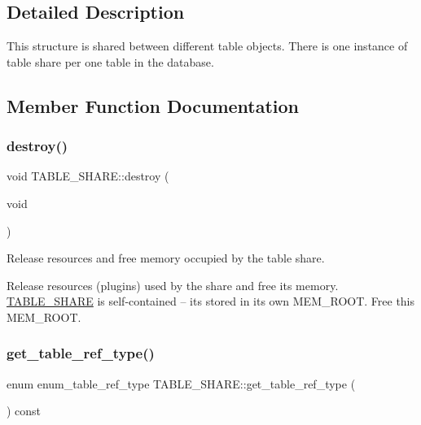 \subsection{Detailed Description}
This structure is shared between different table objects. There is one instance of table share per one table in the database. 

\subsection{Member Function Documentation}
\mbox{\label{structTABLE__SHARE_a18fb7405f4f0af28970bdcbf85aed419}} 
\subsubsection{\texorpdfstring{destroy()}{destroy()}}
{\footnotesize\ttfamily void T\+A\+B\+L\+E\+\_\+\+S\+H\+A\+R\+E\+::destroy (\begin{DoxyParamCaption}\item[{void}]{ }\end{DoxyParamCaption})}

Release resources and free memory occupied by the table share.

Release resources (plugins) used by the share and free its memory. \mbox{\hyperlink{structTABLE__SHARE}{T\+A\+B\+L\+E\+\_\+\+S\+H\+A\+RE}} is self-\/contained -- it\textquotesingle{}s stored in its own M\+E\+M\+\_\+\+R\+O\+OT. Free this M\+E\+M\+\_\+\+R\+O\+OT. \mbox{\label{structTABLE__SHARE_ad3a3e3e4c725c1814866341fd65002bf}} 
\subsubsection{\texorpdfstring{get\+\_\+table\+\_\+ref\+\_\+type()}{get\_table\_ref\_type()}}
{\footnotesize\ttfamily enum enum\+\_\+table\+\_\+ref\+\_\+type T\+A\+B\+L\+E\+\_\+\+S\+H\+A\+R\+E\+::get\+\_\+table\+\_\+ref\+\_\+type (\begin{DoxyParamCaption}{ }\end{DoxyParamCaption}) const\hspace{0.3cm}{\ttfamily [inline]}}

